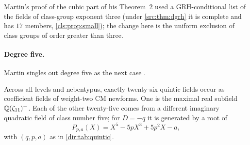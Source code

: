Martin's proof of the cubic part of his Theorem~2 used a GRH-conditional list of the
fields of class-group exponent three (under \cref{src:thm:dgrh} it is complete and has $17$
members, \cref{cls:prop:small}); the change here is the uniform exclusion of class
groups of order greater than three.

\paragraph{Degree five.}
Martin singles out degree five as the next case \cite[Remark~1.2]{Martin2025Rationality}.

\begin{theorem}\label{dir:thm:cmquintic}
Across all levels and nebentypus, exactly twenty-six quintic fields occur as
coefficient fields of weight-two CM newforms. One is the maximal real subfield
$\mathbb{Q}(\zeta_{11})^+$. Each of the other twenty-five comes from a different imaginary
quadratic field of class number five; for $D=-q$ it is generated by a root of
\begin{equation}\label{dir:eq:quinticpoly}
 P_{p,a}(X)=X^5-5pX^3+5p^2X-a ,
\end{equation}
with $(q,p,a)$ as in \cref{dir:tab:quintic}.
\end{theorem}

